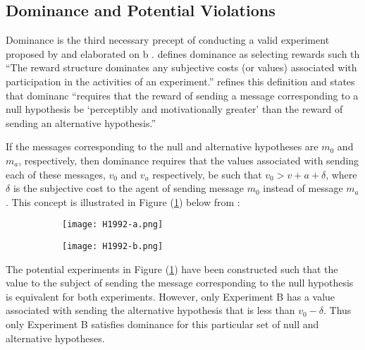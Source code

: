 \documentclass[../main.tex]{subfiles}
\begin{document}
\subsection{Dominance and Potential Violations}

Dominance is the third necessary precept of conducting a valid experiment proposed by \textcite{Smith1982} and elaborated on b \textcite{Harrison1989, Harrison1992}.
\textcite[934]{Smith1982} defines dominance as selecting rewards such th \enquote{The reward structure dominates any subjective costs (or values) associated with participation in the activities of an experiment.}
\textcite[1426]{Harrison1992} refines this definition and states that dominanc \enquote{requires that the reward of sending a message corresponding to a null hypothesis be \enquote{perceptibly and motivationally greater} than the reward of sending an alternative hypothesis.}

If the messages corresponding to the null and alternative hypotheses are $m_0$ and $m_a$, respectively, then dominance requires that the values associated with sending each of these messages, $v_0$ and $v_a$ respectively, be such that $v_0 > v+a + \delta$, where $\delta$ is the subjective cost to the agent of sending message $m_0$ instead of message $m_a$ \parencite[1427]{Harrison1992}.
This concept is illustrated in Figure (\ref{fig:H1992:Dom-a}) below from \textcite[1427]{Harrison1992}:

\begin{figure}[h!]
	\centering
	\caption{ \textcite{Harrison1992} }
	\label{fig:H1992:Dom}
	\begin{subfigure}{.5\textwidth}
		\centering
		\texttt{[image: H1992-a.png]}
		\caption{}
		\label{fig:H1992:Dom-a}
	\end{subfigure}%
	\begin{subfigure}{.5\textwidth}
		\centering
		\texttt{[image: H1992-b.png]}
		\caption{}
		\label{fig:H1992:Dom-b}
	\end{subfigure}
\end{figure}


The potential experiments in Figure (\ref{fig:H1992:Dom-a}) have been constructed such that the value to the subject of sending the message corresponding to the null hypothesis is equivalent for both experiments.
However, only Experiment B has a value associated with sending the alternative hypothesis that is less than $v_0 - \delta$.
Thus only Experiment B satisfies dominance for this particular set of null and alternative hypotheses.
\end{document}
